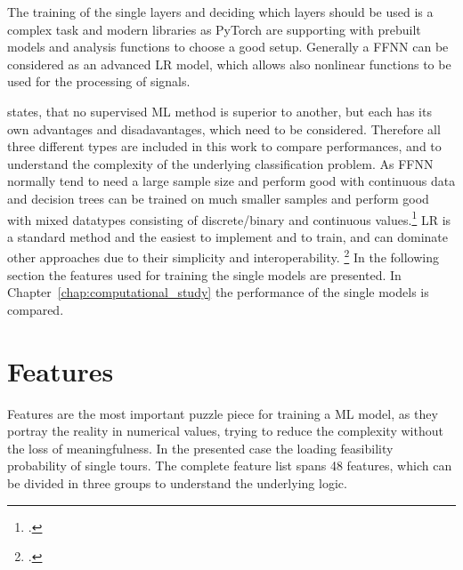 The training of the single layers and deciding which layers should be used is a complex task
and modern libraries as PyTorch are supporting with prebuilt models and analysis functions to choose
a good setup. Generally a \gls{FFNN} can be considered as an advanced \gls{LR} model,
which allows also nonlinear functions to be used for the processing of signals.

\parbreak
\cite{kotsiantis_supervised_2007} states, that no supervised \gls{ML} method is superior to another,
but each has its own advantages and disadavantages, which need to be considered.
Therefore all three different types are included in this work to compare performances, and
to understand the complexity of the underlying classification problem. As \gls{FFNN} normally
tend to need a large sample size and perform good with continuous data and  decision trees can be
trained on much smaller samples and perform good with mixed datatypes consisting of discrete/binary
and continuous values.\footcite[cf.][pp. 262ff.]{kotsiantis_supervised_2007}
\gls{LR} is a standard method and the easiest to implement and to train, and can dominate
other approaches due to their simplicity and interoperability. \footcite[cf.][p.8]{kirasich_random_2018}
In the following section the features used for training the single models are presented.
In Chapter~\ref{chap:computational_study} the performance of the single models is compared.

\begin{comment}
\section{Model Training}
\label{sec:ModelTraining}

Training is based on which model selected, XGBoost or /gls{FFNN} from pytorch library or others. Afterwards the Mini batch descent
algorithm to train the model!
\end{comment}

\section{Features}
\label{sec:Features}

Features are the most important puzzle piece for training a \gls{ML} model, as they portray the reality in numerical values, trying to
reduce the complexity without the loss of meaningfulness. In the presented case the loading feasibility probability of single tours.
The complete feature list spans 48 features, which can be divided in three groups to understand the underlying logic.

